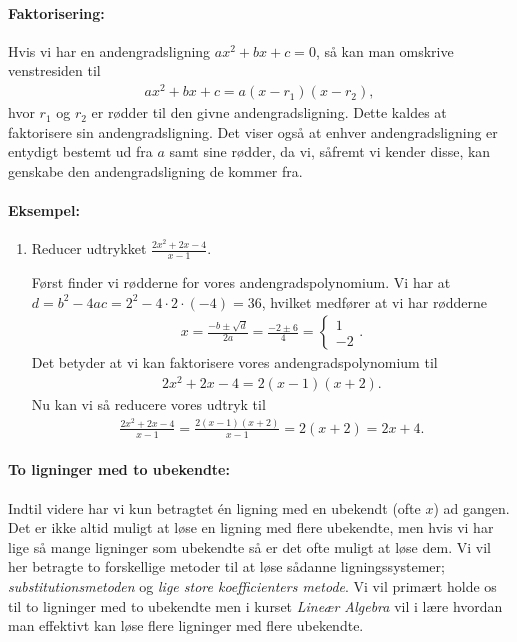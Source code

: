 \paragraph*{Faktorisering:}
Hvis vi har en andengradsligning $ax^2+bx+c=0$, så kan man omskrive venstresiden til
\begin{align*}
ax^2+bx+c = a(x-r_1)(x-r_2),
\end{align*}
hvor $r_1$ og $r_2$ er rødder til den givne andengradsligning. Dette kaldes at faktorisere sin andengradsligning. Det viser også at enhver andengradsligning er entydigt bestemt ud fra $a$ samt sine rødder, da vi, såfremt vi kender disse, kan genskabe den andengradsligning de kommer fra.

\paragraph*{Eksempel:}
\begin{enumerate}
\item Reducer udtrykket $\displaystyle \frac{2x^2+2x-4}{x-1}$.

Først finder vi rødderne for vores andengradspolynomium. Vi har at $d = b^2-4ac = 2^2-4\cdot 2 \cdot (-4) = 36$, hvilket medfører at vi har rødderne
\begin{align*}
x = \frac{-b\pm \sqrt{d}}{2a} = \frac{-2 \pm 6}{4} = \begin{cases} 1 \\ -2 \end{cases}.
\end{align*} 
Det betyder at vi kan faktorisere vores andengradspolynomium til
\begin{align*}
2x^2+2x-4 = 2(x-1)(x+2).
\end{align*}
Nu kan vi så reducere vores udtryk til
\begin{align*}
\frac{2x^2+2x-4}{x-1} = \frac{2(x-1)(x+2)}{x-1} = 2(x+2)=2x+4.
\end{align*}
\end{enumerate}
\paragraph*{To ligninger med to ubekendte:}
Indtil videre har vi kun betragtet én ligning med en ubekendt (ofte $x$) ad gangen. Det er ikke altid muligt at løse en ligning med flere ubekendte, men hvis vi har lige så mange ligninger som ubekendte så er det ofte muligt at løse dem. Vi vil her betragte to forskellige metoder til at løse sådanne ligningssystemer; \emph{substitutionsmetoden} og \emph{lige store koefficienters metode}. Vi vil primært holde os til to ligninger med to ubekendte men i kurset \emph{Lineær Algebra} vil i lære hvordan man effektivt kan løse flere ligninger med flere ubekendte.


